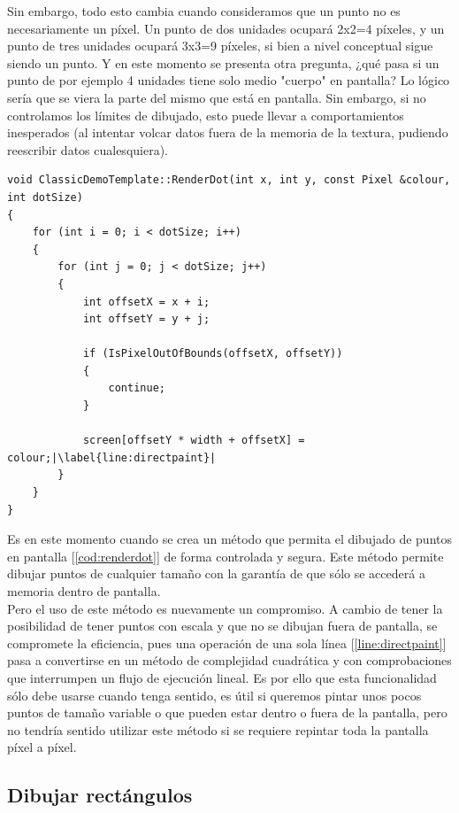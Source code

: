 Sin embargo, todo esto cambia cuando consideramos que un punto no es necesariamente un píxel. Un punto de dos unidades ocupará 2x2=4 píxeles, y un punto de tres unidades ocupará 3x3=9 píxeles, si bien a nivel conceptual sigue siendo un punto. Y en este momento se presenta otra pregunta, ¿qué pasa si un punto de por ejemplo 4 unidades tiene solo medio "cuerpo" en pantalla? Lo lógico sería que se viera la parte del mismo que está en pantalla. Sin embargo, si no controlamos los límites de dibujado, esto puede llevar a comportamientos inesperados (al intentar volcar datos fuera de la memoria de la textura, pudiendo reescribir datos cualesquiera).\\

\begin{lstlisting}[style=C-color, caption={Método para dibujar puntos},label=cod:renderdot,escapechar=|]
void ClassicDemoTemplate::RenderDot(int x, int y, const Pixel &colour, int dotSize)
{
    for (int i = 0; i < dotSize; i++)
    {
        for (int j = 0; j < dotSize; j++)
        {
            int offsetX = x + i;
            int offsetY = y + j;

            if (IsPixelOutOfBounds(offsetX, offsetY))
            {
                continue;
            }

            screen[offsetY * width + offsetX] = colour;|\label{line:directpaint}|
        }
    }
}
\end{lstlisting}

Es en este momento cuando se crea un método que permita el dibujado de puntos en pantalla [\ref{cod:renderdot}] de forma controlada y segura. Este método permite dibujar puntos de cualquier tamaño con la garantía de que sólo se accederá a memoria dentro de pantalla.\\

Pero el uso de este método es nuevamente un compromiso. A cambio de tener la posibilidad de tener puntos con escala y que no se dibujan fuera de pantalla, se compromete la eficiencia, pues una operación de una sola línea [\ref{line:directpaint}] pasa a convertirse en un método de complejidad cuadrática y con comprobaciones que interrumpen un flujo de ejecución lineal. Es por ello que esta funcionalidad sólo debe usarse cuando tenga sentido, es útil si queremos pintar unos pocos puntos de tamaño variable o que pueden estar dentro o fuera de la pantalla, pero no tendría sentido utilizar este método si se requiere repintar toda la pantalla píxel a píxel.

\subsection{Dibujar rectángulos}

